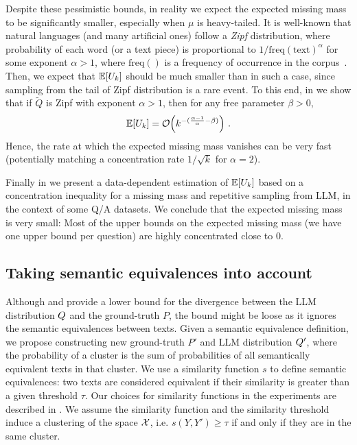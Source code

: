 \documentclass[a4paper]{article}
\theoremstyle{plain}
\theoremstyle{definition}
\theoremstyle{plain}
\begin{document}
Despite these pessimistic bounds, in reality we expect the expected missing
mass to be significantly smaller, especially when $\mu$ is heavy-tailed.
It is well-known that natural languages (and many artificial ones) follow a \emph{Zipf} distribution, where probability of each word (or a text piece) is proportional to $1/\mathrm{freq(text)}^{\alpha}$ for some exponent $\alpha > 1$, where $\mathrm{freq}()$ is a frequency of occurrence in the corpus~\citep{piantadosi2014zipf}.
%
Then, we expect that $\mathbb{E}[U_k]$ should be much smaller than in such a case, since
sampling from the tail of Zipf distribution is a rare event.
%
To this end, in  we show that if $\widetilde Q$ is Zipf with exponent $\alpha > 1$, then for any free parameter $\beta > 0$,
  \begin{align*}
    \mathbb{E}[U_k] = \mathcal{O}\Big(k^{-(\frac{\alpha-1}{\alpha} - \beta)} \Big)~.
  \end{align*}
%  
  Hence, the rate at which the expected missing mass vanishes can be very fast
  (potentially matching a concentration rate $1/\sqrt{k}$ for $\alpha=2$).

Finally in  we present a data-dependent estimation of $\mathbb{E}[U_k]$ based on a concentration inequality for a missing mass and repetitive sampling from LLM, in the context of some Q/A datasets.
%
We conclude that the expected missing mass is very small: Most of the upper bounds on the expected missing mass (we have one upper bound per question) are highly concentrated close to $0$.


\subsection{Taking semantic equivalences into account}
\label{sec:semantic-equivalence}

Although  and  provide a lower bound for the divergence between the LLM distribution $Q$ and the ground-truth $P$, the bound might be loose as it ignores the semantic equivalences between texts. Given a semantic equivalence definition, we propose constructing new ground-truth $P'$ and LLM distribution $Q'$, where the probability of a cluster is the sum of probabilities of all semantically equivalent texts in that cluster. We use a similarity function $s$ to define semantic equivalences: two texts are considered equivalent if their similarity is greater than a given threshold $\tau$. Our choices for similarity functions in the experiments are described in . We assume the similarity function and the similarity threshold induce a clustering of the space ${\mathcal{X}}$, i.e.  $s(Y,Y') \ge \tau$ if and only if they are in the same cluster.
\end{document}
